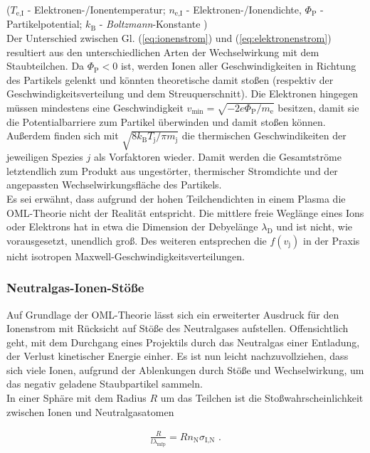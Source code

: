 \documentclass[numbers=noenddot,a4paper]{scrartcl}
\newcommand{\ix}[1]{_\text{#1}}
\newcommand{\tilt}[1]{\textit{#1}}
\begin{document}
		($T\ix{e,I}$ - Elektronen-/Ionentemperatur; $n\ix{e,I}$ - Elektronen-/Ionendichte, $\Phi\ix{P}$ - Partikelpotential; $k\ix{B}$ - \tilt{Boltzmann}-Konstante )\\
		Der Unterschied zwischen Gl. (\ref{eq:ionenstrom}) und (\ref{eq:elektronenstrom}) resultiert aus den unterschiedlichen Arten der Wechselwirkung mit dem Staubteilchen. Da $\Phi\ix{P}<0$ ist, werden Ionen aller Geschwindigkeiten in Richtung des Partikels gelenkt und könnten theoretische damit stoßen (respektiv der Geschwindigkeitsverteilung und dem Streuquerschnitt). Die Elektronen hingegen müssen mindestens eine Geschwindigkeit $v\ix{min}=\sqrt{-2e\Phi\ix{P}/m\ix{e}}$ besitzen, damit sie die Potentialbarriere zum Partikel überwinden und damit stoßen können. Au{\ss}erdem finden sich mit $\sqrt{8k\ix{B}T\ix{j}/\pi m\ix{j}}$ die thermischen Geschwindikeiten der jeweiligen Spezies $j$ als Vorfaktoren wieder. Damit werden die Gesamtstr\"ome letztendlich zum Produkt aus ungest\"orter, thermischer Stromdichte und der angepassten Wechselwirkungsfl\"ache des Partikels. \\
		Es sei erwähnt, dass aufgrund der hohen Teilchendichten in einem Plasma die OML-Theorie nicht der Realität entspricht. Die mittlere freie Weglänge eines Ions oder Elektrons hat in etwa die Dimension der Debyelänge $\lambda\ix{D}$ und ist nicht, wie vorausgesetzt, unendlich groß. Des weiteren entsprechen die $f\left(v\ix{j}\right)$ in der Praxis nicht isotropen Maxwell-Geschwindigkeitsverteilungen.
		
		\subsubsection{Neutralgas-Ionen-Stöße}
		
		Auf Grundlage der OML-Theorie lässt sich ein erweiterter Ausdruck für den Ionenstrom mit Rücksicht auf Stöße des Neutralgases aufstellen. Offensichtlich geht, mit dem Durchgang eines Projektils durch das Neutralgas einer Entladung, der Verlust kinetischer Energie einher. Es ist nun leicht nachzuvollziehen, dass sich viele Ionen, aufgrund der Ablenkungen durch Stöße und Wechselwirkung, um das negativ geladene Staubpartikel sammeln.
		\\In einer Sphäre mit dem Radius $R$ um das Teilchen ist die Stoßwahrscheinlichkeit zwischen Ionen und Neutralgasatomen
		
			\begin{align}
				\frac{R}{l\lambda\ix{mfp}}=Rn\ix{N}\sigma\ix{I,N} \,\, . \label{eq:wahrschein}
			\end{align}
						
\end{document}
